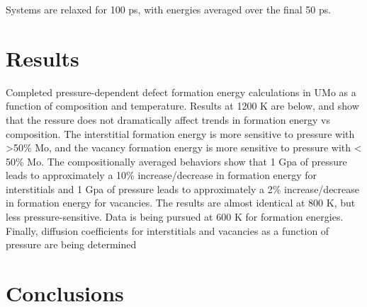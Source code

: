 \documentclass[11pt, oneside]{elsarticle}   	%
\begin{document}
Systems are relaxed for 100 ps, with energies averaged over the final 50 ps. 



\section{Results}

Completed pressure-dependent defect formation energy calculations in UMo as a function of composition and temperature. Results at 1200 K are below, and show that the ressure does not dramatically affect trends in formation energy vs composition. The interstitial formation energy is more sensitive to pressure with >50\% Mo, and the vacancy formation energy is more sensitive to pressure with < 50\% Mo. The compositionally averaged behaviors show that 1 Gpa of pressure leads to approximately a 10\% increase/decrease in formation energy for interstitials and 1 Gpa of pressure leads to approximately a 2\% increase/decrease in formation energy for vacancies. The results are almost identical at 800 K, but less pressure-sensitive. Data is being pursued at 600 K for formation energies. Finally, diffusion coefficients for interstitials and vacancies as a function of pressure are being determined

\section{Conclusions}


\end{document}
